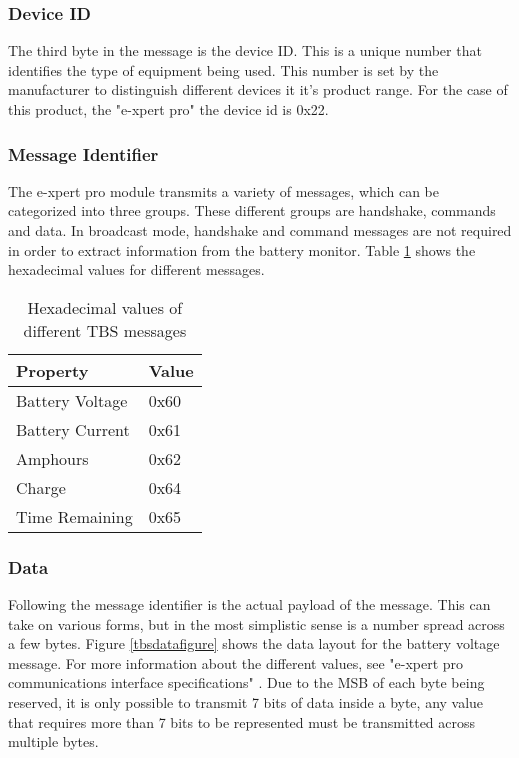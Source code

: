 \subsubsection{Device ID}

The third byte in the message is the device ID. This is a unique number that identifies the type of equipment being used. This number is set by the manufacturer to distinguish different devices it it's product range. For the case of this product, the "e-xpert pro" the device id is 0x22.

\subsubsection{Message Identifier}

The e-xpert pro module transmits a variety of messages, which can be categorized into three groups. These different groups are handshake, commands and data. In broadcast mode, handshake and command messages are not required in order to extract information from the battery monitor. Table \ref{tab:tbsmessages} shows the hexadecimal values for different messages.

\begin{table}
\begin{center}
    \begin{tabular}{|l|l|}
        \hline
        Property & Value \\ \hline
        Battery Voltage   & 0x60 \\
        Battery Current    & 0x61    \\ 
        Amphours    & 0x62    \\ 
        Charge       &  0x64 \\ 
        Time Remaining & 0x65 \\
        \hline
    \end{tabular}
	\caption{Hexadecimal values of different TBS messages}
	\label{tab:tbsmessages}
\end{center}
\end{table}

\subsubsection{Data}

Following the message identifier is the actual payload of the message. This can take on various forms, but in the most simplistic sense is a number spread across a few bytes. Figure \ref{tbsdatafigure} shows the data layout for the battery voltage message. For more information about the different values, see "e-xpert pro communications interface specifications" \cite{e_xpert}.  Due to the MSB of each byte being reserved, it is only possible to transmit 7 bits of data inside a byte, any value that requires more than 7 bits to be represented must be transmitted across multiple bytes.  

